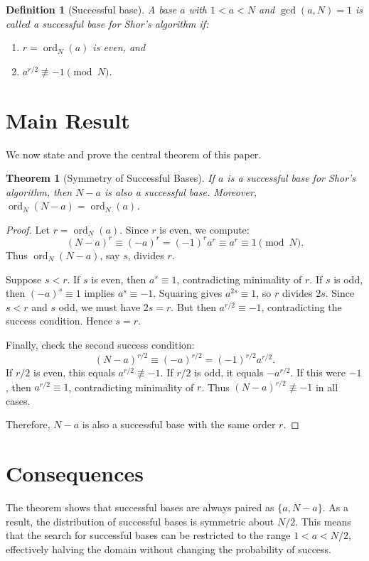 \documentclass[12pt]{article}
\newtheorem{theorem}{Theorem}
\newtheorem{definition}{Definition}
\begin{document}
\begin{definition}[Successful base]
A base $a$ with $1<a<N$ and $\gcd(a,N)=1$ is called a \emph{successful base} for Shor's algorithm if:
\begin{enumerate}
    \item $r=\operatorname{ord}_N(a)$ is even, and
    \item $a^{r/2} \not\equiv -1 \pmod N$.
\end{enumerate}
\end{definition}

\section{Main Result}
We now state and prove the central theorem of this paper.

\begin{theorem}[Symmetry of Successful Bases]
If $a$ is a successful base for Shor's algorithm, then $N-a$ is also a successful base. Moreover, $\operatorname{ord}_N(N-a) = \operatorname{ord}_N(a)$.
\end{theorem}

\begin{proof}
Let $r=\operatorname{ord}_N(a)$. Since $r$ is even, we compute:
\[
(N-a)^r \equiv (-a)^r = (-1)^r a^r \equiv a^r \equiv 1 \pmod N.
\]
Thus $\operatorname{ord}_N(N-a)$, say $s$, divides $r$.

Suppose $s<r$. If $s$ is even, then $a^s\equiv 1$, contradicting minimality of $r$. If $s$ is odd, then $(-a)^s\equiv 1$ implies $a^s\equiv -1$. Squaring gives $a^{2s}\equiv 1$, so $r$ divides $2s$. Since $s<r$ and $s$ odd, we must have $2s=r$. But then $a^{r/2}\equiv -1$, contradicting the success condition. Hence $s=r$.

Finally, check the second success condition:
\[
(N-a)^{r/2} \equiv (-a)^{r/2} = (-1)^{r/2} a^{r/2}.
\]
If $r/2$ is even, this equals $a^{r/2}\not\equiv -1$. If $r/2$ is odd, it equals $-a^{r/2}$. If this were $-1$, then $a^{r/2}\equiv 1$, contradicting minimality of $r$. Thus $(N-a)^{r/2}\not\equiv -1$ in all cases.

Therefore, $N-a$ is also a successful base with the same order $r$.
\end{proof}

\section{Consequences}
The theorem shows that successful bases are always paired as $\{a, N-a\}$. As a result, the distribution of successful bases is symmetric about $N/2$. This means that the search for successful bases can be restricted to the range $1 < a < N/2$, effectively halving the domain without changing the probability of success.
\end{document}
